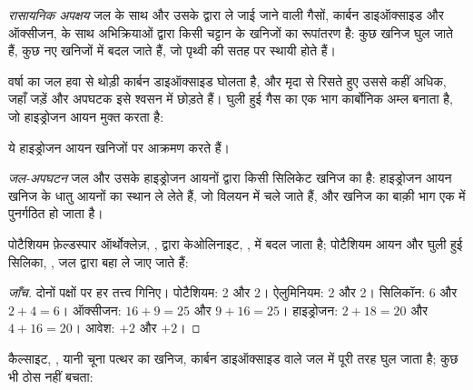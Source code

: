 \begin{definition}[रासायनिक अपक्षय]\label{def:g10:soil-formation:chemical-weathering}
\emph{रासायनिक अपक्षय} जल के साथ और उसके द्वारा ले जाई
जाने वाली गैसों, कार्बन डाइऑक्साइड और ऑक्सीजन, के साथ अभिक्रियाओं द्वारा किसी चट्टान के खनिजों का
रूपांतरण है: कुछ खनिज घुल जाते हैं, कुछ नए खनिजों में बदल
जाते हैं, जो पृथ्वी की सतह पर स्थायी होते हैं।
\end{definition}

वर्षा का जल हवा से थोड़ी कार्बन डाइऑक्साइड घोलता है, और मृदा से रिसते हुए
उससे कहीं अधिक, जहाँ जड़ें और अपघटक इसे श्वसन में छोड़ते हैं। घुली हुई
गैस का एक भाग कार्बोनिक अम्ल बनाता है, जो हाइड्रोजन आयन मुक्त करता है:
\begin{center}
\end{center}
ये हाइड्रोजन आयन खनिजों पर आक्रमण करते हैं।

\begin{definition}[जल-अपघटन]\label{def:g10:soil-formation:hydrolysis}
\emph{जल-अपघटन} जल और उसके हाइड्रोजन आयनों द्वारा किसी सिलिकेट
खनिज का  है: हाइड्रोजन आयन खनिज के धातु आयनों का
स्थान ले लेते हैं, जो विलयन में चले जाते हैं, और खनिज का बाक़ी
भाग एक  में पुनर्गठित हो जाता है।
\end{definition}

\begin{proposition}[फ़ेल्डस्पार का जल-अपघटन]\label{prop:g10:soil-formation:hydrolysis}
पोटैशियम फ़ेल्डस्पार ऑर्थोक्लेज़, ,  द्वारा
 केओलिनाइट, , में बदल जाता है; पोटैशियम आयन और
घुली हुई सिलिका, , जल द्वारा बहा ले जाए जाते हैं:
\begin{center}
\end{center}
\end{proposition}

\begin{proof}[जाँच]
दोनों पक्षों पर हर तत्त्व गिनिए। पोटैशियम: 2 और 2। ऐलुमिनियम: 2 और 2।
सिलिकॉन: 6 और $2 + 4 = 6$। ऑक्सीजन: $16 + 9 = 25$ और $9 + 16 = 25$।
हाइड्रोजन: $2 + 18 = 20$ और $4 + 16 = 20$। आवेश: $+2$ और $+2$।
\end{proof}

\begin{proposition}[कैल्साइट का विलयन]\label{prop:g10:soil-formation:calcite}
कैल्साइट, , यानी चूना पत्थर का खनिज, कार्बन डाइऑक्साइड वाले जल में
पूरी तरह घुल जाता है; कुछ भी ठोस नहीं बचता:
\begin{center}
\end{center}
\end{proposition}

